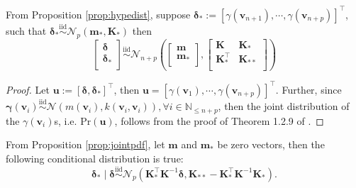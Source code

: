 \begin{prop}\label{prop:jointpdf}
    From Proposition \ref{prop:hypedist}, suppose $\boldsymbol{\delta}_{*}:=[\gamma(\mathbf{v}_{n+1}),\cdots,\gamma(\mathbf{v}_{n+p})]^{\top}$, such that $\boldsymbol{\delta}_{*}\overset{\mathrm{iid}}{\sim}\mathcal{N}_p(\mathbf{m}_*,\mathbf{K}_*)$ then 
    \begin{equation}
        \left[
        \begin{matrix}
            \boldsymbol{\delta}\\
            \boldsymbol{\delta}_{*}\\
        \end{matrix}
        \right]\overset{\mathrm{iid}}{\sim}
        \mathcal{N}_{n+p}\left(\left[
        \begin{matrix}
            \mathbf{m}\\
            \mathbf{m}_{*}\\
        \end{matrix}
        \right],\left[
        \begin{matrix}
            \mathbf{K}&\mathbf{K}_{*}\\
            \mathbf{K}_{*}^{\top}&\mathbf{K}_{**}\\
        \end{matrix}
        \right]\right)
    \end{equation}
\end{prop}
\begin{proof}
    Let $\mathbf{u}:=[\boldsymbol{\delta},\boldsymbol{\delta}_{*}]^{\top}$, then $\mathbf{u}=[\gamma(\mathbf{v}_1),\cdots,\gamma(\mathbf{v}_{n+p})]^{\top}$. Further, since $\mathbf{\gamma}(\mathbf{v}_i)\overset{\mathrm{iid}}{\sim}\mathcal{N}(m(\mathbf{v}_i),k(\mathbf{v}_i,\mathbf{v}_i)),\forall i\in\mathbb{N}_{\leq n+p}$, then the joint distribution of the $\gamma(\mathbf{v}_i)$s, i.e. $\mathrm{Pr}(\mathbf{u})$, follows from the proof of Theorem 1.2.9 of .
\end{proof}
\begin{cor}\label{cor:condpdf}
From Proposition \ref{prop:jointpdf}, let $\mathbf{m}$ and $\mathbf{m}_{*}$ be zero vectors, then the following conditional distribution is true:
    \begin{equation}\label{eq:gp_updater}    \boldsymbol{\delta}_*\mid\boldsymbol{\delta}\overset{\mathrm{iid}}{\sim}\mathcal{N}_{p}(\mathbf{K}_{*}^{\top}\mathbf{K}^{-1}\boldsymbol{\delta},\mathbf{K}_{**}-\mathbf{K}_{*}^{\top}\mathbf{K}^{-1}\mathbf{K}_{*}).
\end{equation}
\end{cor}
